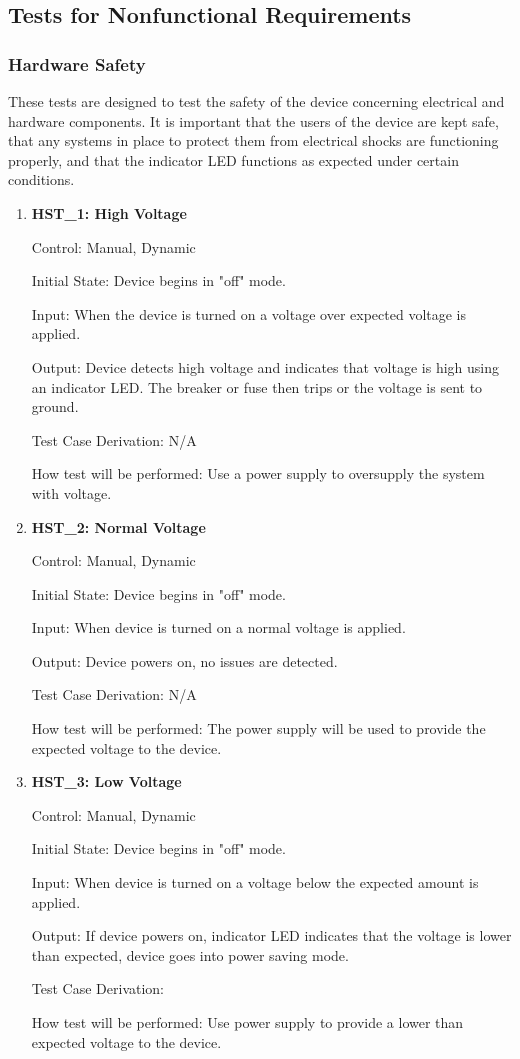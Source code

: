 \documentclass[12pt, titlepage]{article}
\begin{document}
\subsection{Tests for Nonfunctional Requirements}
\subsubsection{Hardware Safety }

These tests are designed to test the safety of the device concerning electrical and hardware components. It is important that the users of the device are kept safe, that any systems in place to protect them from electrical shocks are functioning properly, and that the indicator LED functions as expected under certain conditions.

\begin{enumerate}

\item{\textbf{HST\_1: High Voltage}}\label{HST1}

Control: Manual, Dynamic

Initial State: Device begins in "off" mode.

Input: When the device is turned on a voltage over expected voltage is applied.

Output: Device detects high voltage and indicates that voltage is high using an indicator LED. The breaker or fuse then trips or the voltage is sent to ground.

Test Case Derivation: N/A

How test will be performed: Use a power supply to oversupply the system with voltage. 

\item{\textbf{HST\_2: Normal Voltage}}\label{HST2}

Control: Manual, Dynamic

Initial State: Device begins in "off" mode.

Input: When device is turned on a normal voltage is applied.

Output: Device powers on, no issues are detected.

Test Case Derivation: N/A

How test will be performed: The power supply will be used to provide the expected voltage to the device.

\item{\textbf{HST\_3: Low Voltage}}\label{HST3}

Control: Manual, Dynamic

Initial State: Device begins in "off" mode.

Input: When device is turned on a voltage below the expected amount is applied.

Output: If device powers on, indicator LED indicates that the voltage is lower than expected, device goes into power saving mode.

Test Case Derivation:

How test will be performed: Use power supply to provide a lower than expected voltage to the device.

\end{enumerate}
\end{document}

